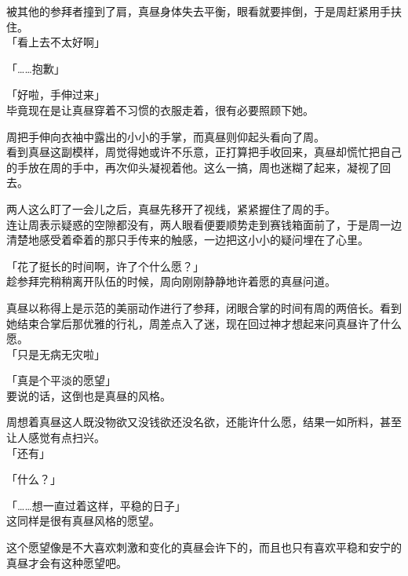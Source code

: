 被其他的参拜者撞到了肩，真昼身体失去平衡，眼看就要摔倒，于是周赶紧用手扶住。\\

「看上去不太好啊」

「……抱歉」

「好啦，手伸过来」\\

毕竟现在是让真昼穿着不习惯的衣服走着，很有必要照顾下她。

周把手伸向衣袖中露出的小小的手掌，而真昼则仰起头看向了周。\\

看到真昼这副模样，周觉得她或许不乐意，正打算把手收回来，真昼却慌忙把自己的手放在周的手中，再次仰头凝视着他。这么一搞，周也迷糊了起来，凝视了回去。

两人这么盯了一会儿之后，真昼先移开了视线，紧紧握住了周的手。\\

连让周表示疑惑的空隙都没有，两人眼看便要顺势走到赛钱箱面前了，于是周一边清楚地感受着牵着的那只手传来的触感，一边把这小小的疑问埋在了心里。\\

\vspace{2\baselineskip}

「花了挺长的时间啊，许了个什么愿？」\\

趁参拜完稍稍离开队伍的时候，周向刚刚静静地许着愿的真昼问道。

真昼以称得上是示范的美丽动作进行了参拜，闭眼合掌的时间有周的两倍长。看到她结束合掌后那优雅的行礼，周差点入了迷，现在回过神才想起来问真昼许了什么愿。\\

「只是无病无灾啦」

「真是个平淡的愿望」\\

要说的话，这倒也是真昼的风格。

周想着真昼这人既没物欲又没钱欲还没名欲，还能许什么愿，结果一如所料，甚至让人感觉有点扫兴。\\

「还有」

「什么？」

「……想一直过着这样，平稳的日子」\\

这同样是很有真昼风格的愿望。

这个愿望像是不大喜欢刺激和变化的真昼会许下的，而且也只有喜欢平稳和安宁的真昼才会有这种愿望吧。\\

